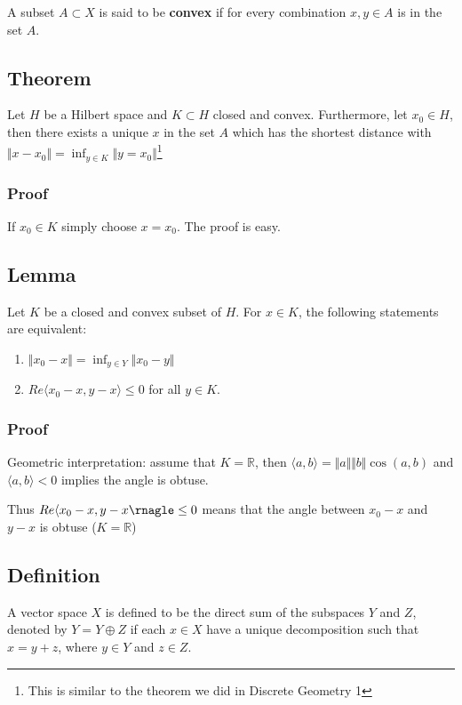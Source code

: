 \documentclass[11pt]{article}
\def\R{\mathbb{R}}
\begin{document}
A subset \(A \subset X\) is said to be \textbf{convex} if for every combination \(x, y
   \in A\) is in the set \(A\).
\subsection{Theorem}
\label{sec:org13cbb29}
Let \(H\) be a Hilbert space and \(K \subset H\) closed and convex. Furthermore,
let \(x_0 \in H\), then there exists a unique \(x\) in the set \(A\) which has the
shortest distance with \(\Vert x - x_0 \Vert = \inf_{y \in K} \Vert y =
   x_0\Vert\)\footnote{This is similar to the theorem we did in Discrete Geometry 1}
\subsubsection{Proof}
\label{sec:org65e5db3}
If \(x_0 \in K\) simply choose \(x = x_0\). The proof is easy.
\subsection{Lemma}
\label{sec:org5f8a160}
Let \(K\) be a closed and convex subset of \(H\). For \(x \in K\), the following
statements are equivalent:

\begin{enumerate}
\item \(\Vert x_0 - x\Vert = \inf_{y\in Y} \Vert x_0 - y\Vert\)
\item \(Re \langle x_0 - x, y -x \rangle \le 0\) for all \(y \in K\).
\end{enumerate}
\subsubsection{Proof}
\label{sec:org776dbba}
Geometric interpretation: assume that \(K=\R\), then \(\langle a, b\rangle =
    \Vert a \Vert \Vert b\Vert \cos(a, b)\) and \(\langle a, b \rangle <0\) implies
the angle is obtuse.

Thus \(Re\langle x_0 - x, y - x\rnagle \le 0\) means that the angle between
\(x_0 - x\) and \(y-x\) is obtuse (\(K = \R\))
\subsection{Definition}
\label{sec:orgbdb3f3e}
A vector space \(X\) is defined to be the direct sum of the subspaces \(Y\) and
\(Z\), denoted by \(Y = Y \oplus Z\) if each \(x \in X\) have a unique
decomposition such that \(x = y + z\), where \(y\in Y\) and \(z \in Z\).
\end{document}
